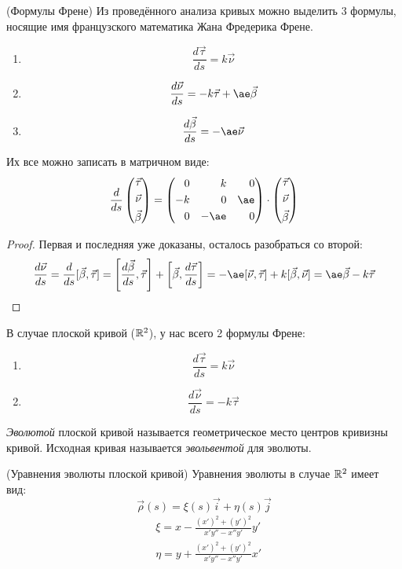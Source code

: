 \begin{theorem} (Формулы Френе)
	Из проведённого анализа кривых можно выделить 3 формулы, носящие имя французского математика Жана Фредерика Френе.
	\begin{enumerate}
		\item \[
			\frac{d\vec{\tau}}{ds} = k\vec{\nu}
		\]
		
		\item \[
			\frac{d\vec{\nu}}{ds} = -k\vec{\tau} + \ae\vec{\beta}
		\]
		
		\item \[
			\frac{d\vec{\beta}}{ds} = -\ae\vec{\nu}
		\]
	\end{enumerate}
	Их все можно записать в матричном виде:
	\[
		\frac{d}{ds}\Matrix{\vec{\tau} \\ \vec{\nu} \\ \vec{\beta}} = \Matrix{0& & k& & 0 \\ -k& & 0& & \ae \\ 0& & -\ae& & 0} \cdot \Matrix{\vec{\tau} \\ \vec{\nu} \\ \vec{\beta}}
	\]
\end{theorem}

\begin{proof}
	Первая и последняя уже доказаны, осталось разобраться со второй:
	\[
		\frac{d\vec{\nu}}{ds} = \frac{d}{ds}[\vec{\beta}, \vec{\tau}] = \left[\frac{d\vec{\beta}}{ds}, \vec{\tau}\right] + \left[\vec{\beta}, \frac{d\vec{\tau}}{ds}\right] = -\ae [\vec{\nu}, \vec{\tau}] + k[\vec{\beta}, \vec{\nu}] = \ae \vec{\beta} - k\vec{\tau}
	\]
\end{proof}

\begin{definition}
	В случае плоской кривой ($\mathbb{R}^2$), у нас всего 2 формулы Френе:
	\begin{enumerate}
		\item \[
			\frac{d\vec{\tau}}{ds} = k\vec{\nu}
		\]
		
		\item \[
			\frac{d\vec{\nu}}{ds} = -k\vec{\tau}
		\]
	\end{enumerate}
	\textit{Эволютой} плоской кривой называется геометрическое место центров кривизны кривой. Исходная кривая называется \textit{эвольвентой} для эволюты.
\end{definition}

\begin{theorem} (Уравнения эволюты плоской кривой)
	Уравнения эволюты в случае $\mathbb{R}^2$ имеет вид:
	\[
		\vec{\rho}(s) = \xi(s)\vec{i} + \eta(s)\vec{j}
	\]
	\begin{align*}
		&{\xi = x - \frac{(x')^2 + (y')^2}{x'y'' - x''y'}y'}
		\\
		&{\eta = y + \frac{(x')^2 + (y')^2}{x'y'' - x''y'}x'}
	\end{align*}
\end{theorem}

